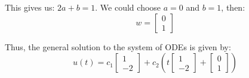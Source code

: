{This gives us: $2a + b = 1$. We could choose $a = 0$ and $b = 1$, then:
\begin{equation*}
w = \begin{bmatrix}
0 \\
1
\end{bmatrix}
\end{equation*}

Thus, the general solution to the system of ODEs is given by:
\begin{equation*}
u(t) = c_1 
\begin{bmatrix}
1 \\
-2 
\end{bmatrix} +
c_2 
\left(
t 
\begin{bmatrix}
1 \\ 
-2
\end{bmatrix}
+ 
\begin{bmatrix}
0 \\
1
\end{bmatrix}
\right)
\end{equation*}
}
